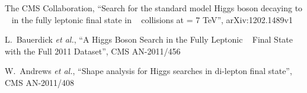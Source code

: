 \begin{thebibliography}{99}

  The CMS Collaboration, ``Search for the standard model Higgs boson decaying to \wwpm~ in the fully leptonic ﬁnal state in \PP~ collisions at \sqrts= 7 TeV'',
  arXiv:1202.1489v1 
     
  L.~Bauerdick {\it et al.}, ``A Higgs Boson Search in the Fully Leptonic \wwpm~ Final State with the Full 2011 Dataset'',
  CMS AN-2011/456 

  W.~Andrews {\it et al.}, ``Shape analysis for Higgs searches in di-lepton final state'',
  CMS AN-2011/408

\end{thebibliography}


